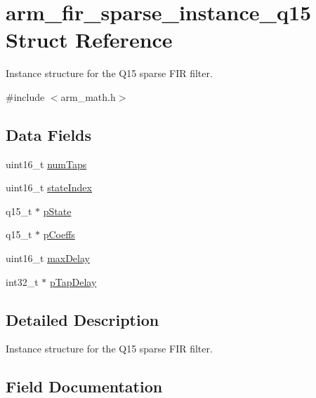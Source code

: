 \hypertarget{structarm__fir__sparse__instance__q15}{}\section{arm\+\_\+fir\+\_\+sparse\+\_\+instance\+\_\+q15 Struct Reference}
\label{structarm__fir__sparse__instance__q15}


Instance structure for the Q15 sparse F\+IR filter.  




{\ttfamily \#include $<$arm\+\_\+math.\+h$>$}

\subsection*{Data Fields}
\begin{DoxyCompactItemize}
\item 
uint16\+\_\+t \mbox{\hyperlink{structarm__fir__sparse__instance__q15_a751941891e47f522a7f5375fe8990aac}{num\+Taps}}
\item 
uint16\+\_\+t \mbox{\hyperlink{structarm__fir__sparse__instance__q15_a566a0cb53437e48b9a3bf18e5b03d8aa}{state\+Index}}
\item 
q15\+\_\+t $\ast$ \mbox{\hyperlink{structarm__fir__sparse__instance__q15_ae29dfdb736374fcddaeaec4b7770170c}{p\+State}}
\item 
q15\+\_\+t $\ast$ \mbox{\hyperlink{structarm__fir__sparse__instance__q15_a7ca181a37f714d174445f486bebce26f}{p\+Coeffs}}
\item 
uint16\+\_\+t \mbox{\hyperlink{structarm__fir__sparse__instance__q15_ab25f4ee7550e6d92acff77ada283733f}{max\+Delay}}
\item 
int32\+\_\+t $\ast$ \mbox{\hyperlink{structarm__fir__sparse__instance__q15_adec00b3793ab4f08edfeb4ea6a9eb6e6}{p\+Tap\+Delay}}
\end{DoxyCompactItemize}


\subsection{Detailed Description}
Instance structure for the Q15 sparse F\+IR filter. 

\subsection{Field Documentation}
\mbox{\label{structarm__fir__sparse__instance__q15_ab25f4ee7550e6d92acff77ada283733f}} 
